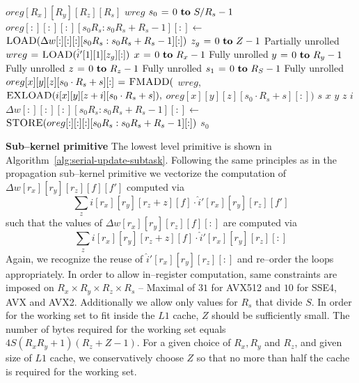   \begin{algorithm}
    {\footnotesize
      \begin{codebox}
        \li {} $oreg[R_x][R_y][R_z][R_s]$
        \li {} $wreg$
        \li \For $s_0 \gets 0 \To S/R_s - 1$
        \li \Do $oreg[:][:][:][s_0R_s:s_0R_s+R_s-1][:] \gets$
        \li   \Do $\textnormal{\scshape LOAD}(\Delta w[:][:][:][s_0R_s:s_0R_s+R_s-1][:])$
        \End
        \li \For $z_g \gets 0 \To Z-1$ \Comment Partially unrolled
        \li   \Do $wreg \mathrel{\hspace{1pt}=\hspace{1pt}} \textnormal{\scshape LOAD}(\hat{i}'[1][1][z_g][:])$
        \li   \For $x \gets 0 \To R_x-1$ \Comment Fully unrolled
        \li   \Do \For $y \gets 0 \To R_y-1$  \Comment Fully unrolled
        \li   \Do \For $z \gets 0 \To R_z-1$  \Comment Fully unrolled
        \li   \Do \For $s_1 \gets 0 \To R_S-1$   \Comment Fully unrolled
        \li   \Do $oreg[x][y][z][s_0 \cdot R_s + s][:] \mathrel{\hspace{1pt}=\hspace{1pt}} \textnormal{\scshape FMADD}($
        \li   \Do $wreg,$
        \li       $\textnormal{\scshape EXLOAD}(i[x][y][z+i][s_0 \cdot R_s + s]),$
        \li       $oreg[x][y][z][s_0 \cdot R_s + s][:])$
        \End
        \End \li {} $s$
        \End \li {} $x$
        \End \li {} $y$
        \End \li {} $z$
        \End \li {} $i$
        \li $\Delta w[:][:][:][s_0R_s:s_0R_s+R_s-1][:] \gets$
        \li \Do $\textnormal{\scshape STORE}(oreg[:][:][:][s_0R_s:s_0R_s+R_s-1][:])$
        \End
        \End \li {} $s_0$
      \end{codebox}
    \caption{Finest granularity update primitive.}
    \label{alg:serial-update-subtask}
    }
  \end{algorithm}

  {\bf Sub--kernel primitive} \quad The lowest level primitive is
  shown in Algorithm~\ref{alg:serial-update-subtask}.  Following the
  same principles as in the propagation sub--kernel primitive we
  vectorize the computation of $\Delta w[r_x][r_y][r_z][f][f']$ computed
  via {\small
  \[
  \sum_{z}
  i[r_x][r_y][r_z+z][f] \cdot \hat{i}'[r_x][r_y][r_z][f']
  \]
  } such that the values of $\Delta w[r_x][r_y][r_z][f][:]$ are computed
  via {\small
  \[
  \sum_{z}
  i[r_x][r_y][r_z+z][f] \cdot \hat{i}'[r_x][r_y][r_z][:]
  \]
  } Again, we recognize the reuse of $\hat{i}'[r_x][r_y][r_z][:]$ and
  re--order the loops appropriately.  In order to allow in--register
  computation, same constraints are imposed on $R_x \times R_y \times
  R_z \times R_s$ -- Maximal of $31$ for AVX512 and $10$ for SSE4, AVX
  and AVX2.  Additionally we allow only values for $R_s$ that divide
  $S$.  In order for the working set to fit inside the $L1$ cache, $Z$
  should be sufficiently small.  The number of bytes required for the
  working set equals $4S(R_xR_y+1)(R_z+Z-1)$.  For a given choice of
  $R_x, R_y$ and $R_z$, and given size of $L1$ cache, we
  conservatively choose $Z$ so that no more than half the cache is
  required for the working set.

